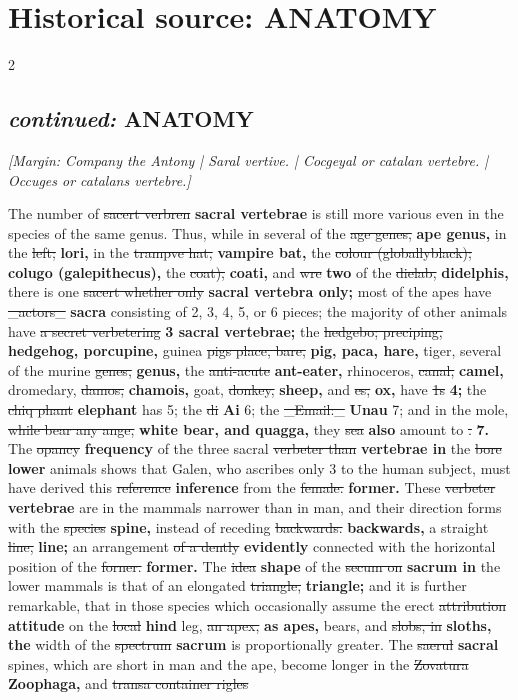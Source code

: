 \documentclass[10pt]{article}
\begin{document}
\section*{Historical source: ANATOMY}
\begin{multicols}{2}
\subsection*{\textit{continued:} ANATOMY}
{\small\itshape [Margin: Company the Antony | Saral vertive. | Cocgeyal or catalan vertebre. | Occuges or catalans vertebre.]}\par
The number of \sout{sacert verbren} \textbf{sacral vertebrae} is still more various even in the species of the same genus. Thus, while in several of the \sout{age genes,} \textbf{ape genus,} in the \sout{left;} \textbf{lori,} in the \sout{trampve hat,} \textbf{vampire bat,} the \sout{colour (globallyblack);} \textbf{colugo (galepithecus),} the \sout{coat),} \textbf{coati,} and \sout{wre} \textbf{two} of the \sout{dielab,} \textbf{didelphis,} there is one \sout{sacert whether only} \textbf{sacral vertebra only;} most of the apes have \sout{\_actors\_} \textbf{sacra} consisting of 2, 3, 4, 5, or 6 pieces; the majority of other animals have \sout{a secret verbetering} \textbf{3 sacral vertebrae;} the \sout{hedgebo; preciping,} \textbf{hedgehog, porcupine,} guinea \sout{pigs place, bare,} \textbf{pig, paca, hare,} tiger, several of the murine \sout{genes,} \textbf{genus,} the \sout{anti-acute} \textbf{ant-eater,} rhinoceros, \sout{canal,} \textbf{camel,} dromedary, \sout{damos,} \textbf{chamois,} goat, \sout{donkey,} \textbf{sheep,} and \sout{es,} \textbf{ox,} have \sout{1s} \textbf{4;} the \sout{chiq phant} \textbf{elephant} has 5; the \sout{di} \textbf{Ai} 6; the \sout{\_Email:\_} \textbf{Unau} 7; and in the mole, \sout{while bear any ange,} \textbf{white bear, and quagga,} they \sout{sea} \textbf{also} amount to \sout{.} \textbf{7.} The \sout{opancy} \textbf{frequency} of the three sacral \sout{verbeter than} \textbf{vertebrae in} the \sout{bore} \textbf{lower} animals shows that Galen, who ascribes only 3 to the human subject, must have derived this \sout{reference} \textbf{inference} from the \sout{female.} \textbf{former.} These \sout{verbeter} \textbf{vertebrae} are in the mammals narrower than in man, and their direction forms with the \sout{species} \textbf{spine,} instead of receding \sout{backwards.} \textbf{backwards,} a straight \sout{line,} \textbf{line;} an arrangement \sout{of a dently} \textbf{evidently} connected with the horizontal position of the \sout{forner.} \textbf{former.} The \sout{idea} \textbf{shape} of the \sout{secum on} \textbf{sacrum in} the lower mammals is that of an elongated \sout{triangle,} \textbf{triangle;} and it is further remarkable, that in those species which occasionally assume the erect \sout{attribution} \textbf{attitude} on the \sout{local} \textbf{hind} leg, \sout{an apex,} \textbf{as apes,} bears, and \sout{slobs, in} \textbf{sloths, the} width of the \sout{spectrum} \textbf{sacrum} is proportionally greater. The \sout{saerul} \textbf{sacral} spines, which are short in man and the ape, become longer in the \sout{Zovatura} \textbf{Zoophaga,} and \sout{transa container rigles} 
\end{multicols}
\end{document}
